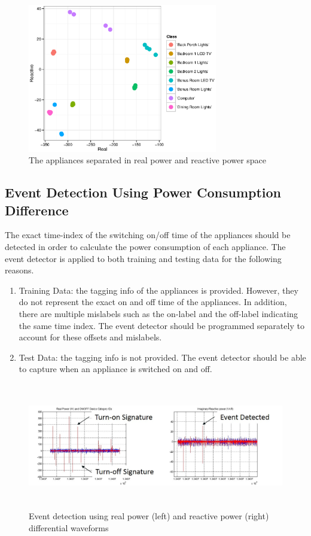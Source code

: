 \documentclass[11pt, letterpaper]{article}
\begin{document}
\begin{figure}[h]
\centering  
\includegraphics[height=6.5cm]{fig/ggplot.eps}
\caption{The appliances separated in real power and reactive power space}
\label{fig:PQ}
\end{figure}
 
\subsection{Event Detection Using Power Consumption Difference}
The exact time-index of the switching on/off time of the appliances should be detected in order to calculate the power consumption of each appliance.  The event detector is applied to both training and testing data for the following reasons.
\begin{enumerate}
\item{Training Data: the tagging info of the appliances is provided.  However, they do not represent the exact on and off time of the appliances.  In addition, there are multiple mislabels such as the on-label and the off-label indicating the same time index.  The event detector should be programmed separately to account for these offsets and mislabels.}
\item{Test Data: the tagging info is not provided.  The event detector should be able to capture when an appliance is switched on and off. }
\end{enumerate}

\begin{figure}[h]
\centering
\includegraphics[height=5.5cm]{fig/event.jpg}
\caption{Event detection using real power (left) and reactive power (right) differential waveforms}
\label{fig:event}
\end{figure}
\end{document}
